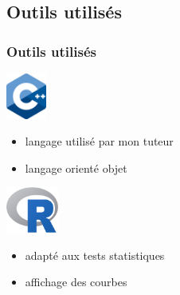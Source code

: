 \documentclass{beamer}
\theoremstyle{remark}
\theoremstyle{plain}
\begin{document}
\subsection{Outils utilisés}
\begin{frame}
    \frametitle{Outils utilisés}
    \includegraphics[height=1.5cm]{images/cpp_logo.png}
    \begin{itemize}%
        \item{langage utilisé par mon tuteur}
        \item{langage orienté objet}
    \end{itemize}
    \vspace{0.5cm}
    \includegraphics[height=1.5cm]{images/Rlogo.png}
    \begin{itemize}%
        \item{adapté aux tests statistiques}
        \item{affichage des courbes}
    \end{itemize}
\end{frame}
\end{document}
